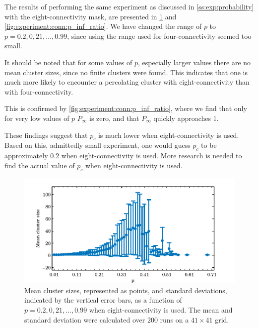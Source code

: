 The results of performing the same experiment as discussed in \cref{ss:exp:probability} with the eight-connectivity mask, are presented in \cref{fig:experiment:conn:mean_std_clusters} and \ref{fig:experiment:conn:p_inf_ratio}. We have changed the range of $p$ to $p = 0.2, 0,21, \dotsc, 0.99$, since using the range used for four-connectivity seemed too small.

It should be noted that for some values of $p$, especially larger values there are no mean cluster sizes, since no finite clusters were found. This indicates that one is much more likely to encounter a percolating cluster with eight-connectivity than with four-connectivity.  

This is confirmed by \cref{fig:experiment:conn:p_inf_ratio}, where we find that only for very low values of $p$ $P_\infty$ is zero, and that $P_\infty$ quickly approaches 1. 

These findings suggest that $p_c$ is much lower when eight-connectivity is used. Based on this, admittedly small experiment, one would guess $p_c$ to be approximately $0.2$ when eight-connectivity is used. More research is needed to find the actual value of $p_c$ when eight-connectivity is used.\\

\begin{figure}
	\centering
	\includegraphics[width=\textwidth]{./img/assignment_d_mean_std_p.pdf}
	\caption{Mean cluster sizes, represented as points, and standard deviations, indicated by the vertical error bars, as a function of $p = 0.2, 0,21, \dotsc, 0.99$ when eight-connectivity is used. The mean and standard deviation were calculated over $200$ runs on a $41 \times 41$ grid.}
	\label{fig:experiment:conn:mean_std_clusters}
\end{figure}

